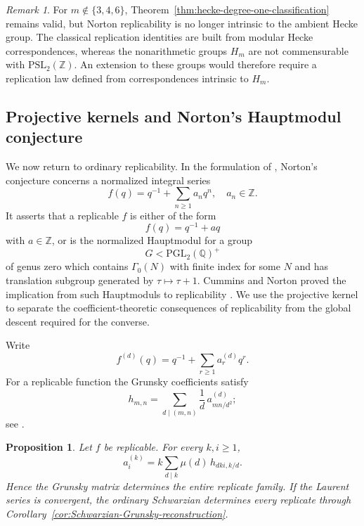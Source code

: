 \documentclass[11pt]{amsart}
\newtheorem{prop}[thm]{Proposition}
\theoremstyle{definition}
\theoremstyle{remark}
\newtheorem{remark}[thm]{Remark}
\numberwithin{equation}{section}
\begin{document}
\begin{remark}\label{rem:nonarithmetic-hecke}
For $m\notin\{3,4,6\}$, Theorem~\ref{thm:hecke-degree-one-classification} remains valid, but Norton replicability is no longer intrinsic to the ambient Hecke group. The classical replication identities are built from modular Hecke correspondences, whereas the nonarithmetic groups $H_m$ are not commensurable with $\mathrm{PSL}_2(\mathbb Z)$. An extension to these groups would therefore require a replication law defined from correspondences intrinsic to $H_m$.
\end{remark}

\subsection{Projective kernels and Norton's Hauptmodul conjecture}\label{subsec:norton-hauptmodul}

We now return to ordinary replicability. In the formulation of \cite{cummins-norton}, Norton's conjecture concerns a normalized integral series
\[
f(q)=q^{-1}+\sum_{n\geq1}a_nq^n,
\quad a_n\in\mathbb Z.
\]
It asserts that a replicable $f$ is either of the form
\begin{equation}\label{eq:norton-exceptional-family}
f(q)=q^{-1}+aq
\end{equation}
with $a\in\mathbb Z$, or is the normalized Hauptmodul for a group
\[
G<\mathrm{PGL}_2(\mathbb Q)^+
\]
of genus zero which contains $\Gamma_0(N)$ with finite index for some $N$ and has translation subgroup generated by $\tau\mapsto\tau+1$. Cummins and Norton proved the implication from such Hauptmoduls to replicability \cite{cummins-norton}. We use the projective kernel to separate the coefficient-theoretic consequences of replicability from the global descent required for the converse.

Write
\[
f^{(d)}(q)=q^{-1}+\sum_{r\geq1}a_r^{(d)}q^r.
\]
For a replicable function the Grunsky coefficients satisfy
\begin{equation}\label{eq:grunsky-replicate-coefficients}
h_{m,n}
=
\sum_{d\mid(m,n)}\frac1d\,
a_{mn/d^2}^{(d)};
\end{equation}
see \cite{norton-more,mckay-sebbar-replicable,cummins-norton}.

\begin{prop}\label{prop:replicate-reconstruction}
Let $f$ be replicable. For every $k,i\geq1$,
\begin{equation}\label{eq:replicate-from-grunsky}
a_i^{(k)}
=
k\sum_{d\mid k}\mu(d)\,h_{dki,k/d}.
\end{equation}
Hence the Grunsky matrix determines the entire replicate family. If the Laurent series is convergent, the ordinary Schwarzian determines every replicate through Corollary~\ref{cor:Schwarzian-Grunsky-reconstruction}.
\end{prop}
\end{document}
